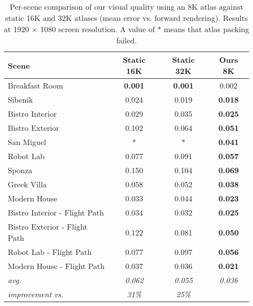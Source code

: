 \begin{table}[ht]
\scriptsize
\setlength{\tabcolsep}{2pt}
\setlength{\intextsep}{0pt}
\centering
\begin{tabular}{lccc}
\textbf{Scene}                & \textbf{Static 16K} & \textbf{Static 32K} & \textbf{Ours 8K}        \\
\hline
Breakfast Room                & \textbf{0.001}      & \textbf{0.001}      & 0.002                   \\
Sibenik                       & 0.024               & 0.019               & \textbf{0.018}          \\
Bistro Interior               & 0.029               & 0.035               & \textbf{0.025}          \\
Bistro Exterior               & 0.102               & 0.064               & \textbf{0.051}          \\
San Miguel                    & *                   & *                   & \textbf{0.041}          \\
Robot Lab                     & 0.077               & 0.091               & \textbf{0.057}          \\
Sponza                        & 0.150               & 0.104               & \textbf{0.069}          \\
Greek Villa                   & 0.058               & 0.052               & \textbf{0.038}          \\
Modern House                  & 0.033               & 0.044               & \textbf{0.023}          \\
Bistro Interior - Flight Path & 0.034               & 0.032               & \textbf{0.025}          \\
Bistro Exterior - Flight Path & 0.122               & 0.081               & \textbf{0.050}          \\
Robot Lab - Flight Path       & 0.077               & 0.097               & \textbf{0.056}          \\
Modern House - Flight Path    & 0.037               & 0.036               & \textbf{0.021}          \\
\hline
\textit{avg.}                 & \textit{0.062}      & \textit{0.055}      & \textit{0.036}   \\
\textit{improvement vs.}      & \textit{31\%}       & \textit{25\%}       &                 
\end{tabular} 

\vspace{1mm}
\caption{Per-scene comparison of our visual quality using an 8K atlas against static 16K and 32K atlases (mean \FLIP error vs. forward rendering). Results at 1920 $\times$ 1080 screen resolution. A value of * means that atlas packing failed.}
\label{tab:supp_flip_infinite_atlas}
\vspace{-3mm}
\end{table}
